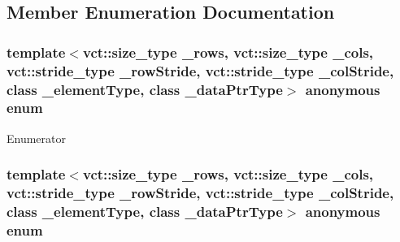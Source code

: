 \subsection{Member Enumeration Documentation}
\hypertarget{classvct_fixed_size_const_matrix_base_ab96748397b9d0700e8c892b7700c29b3}{}\subsubsection[{anonymous enum}]{\setlength{\rightskip}{0pt plus 5cm}template$<$vct\+::size\+\_\+type \+\_\+rows, vct\+::size\+\_\+type \+\_\+cols, vct\+::stride\+\_\+type \+\_\+row\+Stride, vct\+::stride\+\_\+type \+\_\+col\+Stride, class \+\_\+element\+Type, class \+\_\+data\+Ptr\+Type$>$ anonymous enum}\label{classvct_fixed_size_const_matrix_base_ab96748397b9d0700e8c892b7700c29b3}
\begin{Desc}
\item[Enumerator]\par
\begin{description}
\item[{\em 
\hypertarget{classvct_fixed_size_const_matrix_base_ab96748397b9d0700e8c892b7700c29b3a8f93683e9a4da14eb3a7005b19ad135f}{}D\+I\+M\+E\+N\+S\+I\+O\+N\label{classvct_fixed_size_const_matrix_base_ab96748397b9d0700e8c892b7700c29b3a8f93683e9a4da14eb3a7005b19ad135f}
}]\end{description}
\end{Desc}
\hypertarget{classvct_fixed_size_const_matrix_base_a05da4a844e1880e31d3052abb9a8063b}{}\subsubsection[{anonymous enum}]{\setlength{\rightskip}{0pt plus 5cm}template$<$vct\+::size\+\_\+type \+\_\+rows, vct\+::size\+\_\+type \+\_\+cols, vct\+::stride\+\_\+type \+\_\+row\+Stride, vct\+::stride\+\_\+type \+\_\+col\+Stride, class \+\_\+element\+Type, class \+\_\+data\+Ptr\+Type$>$ anonymous enum}\label{classvct_fixed_size_const_matrix_base_a05da4a844e1880e31d3052abb9a8063b}
